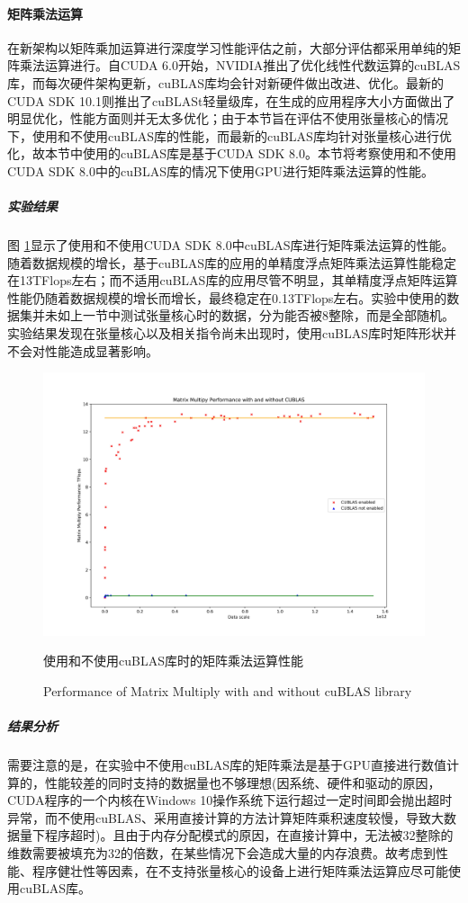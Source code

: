 \paragraph{矩阵乘法运算}
\par 在新架构以矩阵乘加运算进行深度学习性能评估之前，大部分评估都采用单纯的矩阵乘法运算进行。自CUDA 6.0开始，NVIDIA推出了优化线性代数运算的cuBLAS库，而每次硬件架构更新，cuBLAS库均会针对新硬件做出改进、优化。最新的CUDA SDK 10.1则推出了cuBLASt轻量级库，在生成的应用程序大小方面做出了明显优化，性能方面则并无太多优化；由于本节旨在评估不使用张量核心的情况下，使用和不使用cuBLAS库的性能，而最新的cuBLAS库均针对张量核心进行优化，故本节中使用的cuBLAS库是基于CUDA SDK 8.0。本节将考察使用和不使用CUDA SDK 8.0中的cuBLAS库的情况下使用GPU进行矩阵乘法运算的性能。
\subparagraph{实验结果}
\par 图 \ref{Fig.CUBLASPerf}显示了使用和不使用CUDA SDK 8.0中cuBLAS库进行矩阵乘法运算的性能。随着数据规模的增长，基于cuBLAS库的应用的单精度浮点矩阵乘法运算性能稳定在13TFlops左右；而不适用cuBLAS库的应用尽管不明显，其单精度浮点矩阵运算性能仍随着数据规模的增长而增长，最终稳定在0.13TFlops左右。实验中使用的数据集并未如上一节中测试张量核心时的数据，分为能否被8整除，而是全部随机。实验结果发现在张量核心以及相关指令尚未出现时，使用cuBLAS库时矩阵形状并不会对性能造成显著影响。
\begin{figure}
	\centering
	\includegraphics[width=15cm]{figures/CUBLASPerf.jpg}
	\renewcommand{\thefigure}{\arabic{section}-\arabic{figure} }
	\renewcommand{\figurename}{图}
	\caption{使用和不使用cuBLAS库时的矩阵乘法运算性能}
	\addtocounter{figure}{-1}
	\renewcommand{\thefigure}{\arabic{section}-\arabic{figure} }
	\renewcommand{\figurename}{Figure}
	\caption{Performance of Matrix Multiply with and without cuBLAS library}
	\label{Fig.CUBLASPerf}
\end{figure}
\subparagraph{结果分析}
\par 需要注意的是，在实验中不使用cuBLAS库的矩阵乘法是基于GPU直接进行数值计算的，性能较差的同时支持的数据量也不够理想(因系统、硬件和驱动的原因，CUDA程序的一个内核在Windows 10操作系统下运行超过一定时间即会抛出超时异常，而不使用cuBLAS、采用直接计算的方法计算矩阵乘积速度较慢，导致大数据量下程序超时)。且由于内存分配模式的原因，在直接计算中，无法被32整除的维数需要被填充为32的倍数，在某些情况下会造成大量的内存浪费。故考虑到性能、程序健壮性等因素，在不支持张量核心的设备上进行矩阵乘法运算应尽可能使用cuBLAS库。

